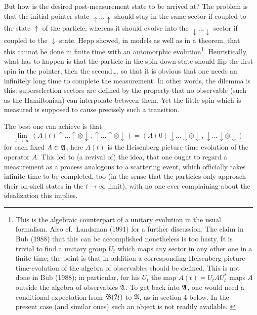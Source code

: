 \documentclass[12pt,titlepage]{article}
\newcommand{\raw}{\rightarrow}
\newcommand{\A}{\frak A}
\newcommand{\B}{\frak B}
\renewcommand{\H}{\mbox{$\cal H$}}
\renewcommand{\ll}{\label}
\newcommand{\fn}{\footnote}
\newcommand{\ot}{\otimes}
\newcommand{\up}{\uparrow}
\newcommand{\dow}{\downarrow}
\newcommand{\Up}{\uparrow\ldots\uparrow}
\newcommand{\Do}{\downarrow\ldots\downarrow}
\begin{document}
But how is the desired post-measurement state to be arrived at? The problem is
that the initial
pointer state $\Up$ should stay in the same sector if coupled to the state
$\up$ of the particle,
whereas it should evolve into the $\Do$ sector if coupled to the $\dow$ state.
Hepp showed, in models
as well as in a theorem,  that this cannot be done in finite time with an
automorphic
evolution\fn{This is the algebraic counterpart of a unitary evolution in the
usual formalism.
Also cf.\ Landsman (1991) for a further discussion. The
claim
in  Bub (1988) that this can be accomplished nonetheless is too hasty. It is
trivial to find a unitary
group $U_t$ which maps any sector in any other one in a finite time; the point
is that in addition  a
corresponding Heisenberg picture time-evolution of the algebra of observables
should be defined. This
is not done in  Bub (1988); in particular, for his $U_t$ the map
$A(t)=U_tAU_t^*$ maps $A$ outside the
algebra of observables $\A$.  To get back into $\A$, one would need a
conditional expectation
from $\B(\H)$ to $\A$, as in section 4 below. In the present case (and similar
ones) such an object
is not readily available. \ll{bub}}. Heuristically, what has to happen is that
the particle in the
spin down state should flip the first spin in the pointer, then the
second\ldots, so that it is
obvious that one needs an infinitely long time to complete the measurement.
 In other words, the dilemma is this: superselection sectors are defined by the
property that no observable (such as the Hamiltonian) can interpolate between
them. Yet the little
spin which is measured is supposed to cause precisely such a transition.

The best one can achieve is that
$$\lim_{t\raw\infty}(A(t)\Up\ot\dow,\Up\ot\dow)=(A(0)\Do\ot\dow,\Do\ot\dow)$$
for each fixed $A\in\A$;
here $A(t)$ is the Heisenberg picture time evolution of the operator $A$.
This led to (a revival of) the idea, that one ought to regard a measurement as
a process analogous
to a scattering event, which  officially takes infinite time to be completed,
too (in the sense that
the particles only approach their on-shell states in the $t\raw\infty$ limit),
with no one ever
complaining about the idealization this implies.
\end{document}
